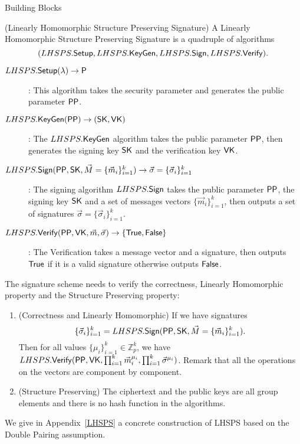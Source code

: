 \begin{subsection}{Building Blocks}
  \begin{myDef}{(Linearly Homomorphic Structure Preserving Signature)}
    A Linearly Homomorphic Structure Preserving Signature is a quadruple of algorithms
    $$(LHSPS.{\mathsf{Setup}}, LHSPS.{\mathsf{KeyGen}}, LHSPS.{\mathsf{Sign}}, LHSPS.{\mathsf{Verify}}).$$
    \begin{description}
    \item[$\boldmath{LHSPS.{\mathsf{Setup}}(\lambda) \to \mathsf{P}}$]: This algorithm takes the security parameter and generates the public parameter $\mathsf{PP}$.
    \item[$\boldmath{LHSPS.{\mathsf{KeyGen}}(\mathsf{PP}) \to (\mathsf{SK}, \mathsf{VK})}$]: The $LHSPS.{\mathsf{KeyGen}}$ algorithm takes the public parameter $\mathsf{PP}$, then generates the signing key $\mathsf{SK}$ and the verification key $\mathsf{VK}$.
    \item[$\boldmath{LHSPS.{\mathsf{Sign}}(\mathsf{PP}, \mathsf{SK}, \vec{M} = \{\vec{m}_i\}_{i=1}^k) \to \vec{\sigma} = \{\vec{\sigma}_i\}_{i=1}^k}$]: The signing algorithm $LHSPS.{\mathsf{Sign}}$ takes the public parameter $\mathsf{PP}$, the signing key $\mathsf{SK}$ and a set of messages vectors $\{\vec{m}_i\}_{i=1}^k$, then outputs a set of signatures $\vec{\sigma} = \{\vec{\sigma}_i\}_{i=1}^k$.
    \item[$\boldmath{LHSPS.{\mathsf{Verify}}(\mathsf{PP}, \mathsf{VK}, \vec{m}, \vec{\sigma}) \to \{\mathsf{True}, \mathsf{False}\}}$]: The Verification takes a message vector and a signature, then outputs $\mathsf{True}$ if it is a valid signature otherwise outputs $\mathsf{False}$.
    \end{description}

    The signature scheme needs to verify the correctness, Linearly Homomorphic property and the Structure Preserving property:
    \begin{enumerate}
    \item (Correctness and Linearly Homomorphic) If we have signatures
      $$\{\vec{\sigma}_i\}_{i=1}^k = LHSPS.{\mathsf{Sign}}(\mathsf{PP}, \mathsf{SK}, \vec{M} = \{\vec{m}_i\}_{i=1}^k).$$
      Then for all values $\{\mu_i\}_{i = 1}^k \in \mathbb{Z}_p^k$,
      we have $LHSPS.{\mathsf{Verify}}(\mathsf{PP}, \mathsf{VK}, \prod_{i=1}^k\vec{m}_i^{\mu_i}, \prod_{i=1}^k\vec{\sigma}^{\mu_i})$. Remark that all the operations on the vectors are component by component.
    \item (Structure Preserving) The ciphertext and the public keys are all group elements and there is no hash function in the algorithms.
    \end{enumerate}
  \end{myDef}

  We give in Appendix~\ref{LHSPS} a concrete construction of LHSPS based on the Double Pairing assumption.


\end{subsection}
